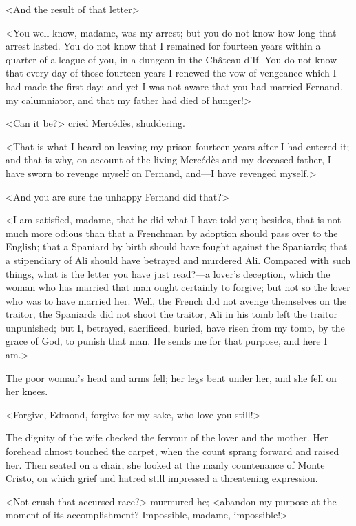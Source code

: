  <And the result of that letter\longdash> 

 <You well know, madame, was my arrest; but you do not know how long that arrest lasted. You do not know that I remained for fourteen years within a quarter of a league of you, in a dungeon in the Château d'If. You do not know that every day of those fourteen years I renewed the vow of vengeance which I had made the first day; and yet I was not aware that you had married Fernand, my calumniator, and that my father had died of hunger!> 

 <Can it be?> cried Mercédès, shuddering. 

 <That is what I heard on leaving my prison fourteen years after I had entered it; and that is why, on account of the living Mercédès and my deceased father, I have sworn to revenge myself on Fernand, and—I have revenged myself.> 

 <And you are sure the unhappy Fernand did that?> 

 <I am satisfied, madame, that he did what I have told you; besides, that is not much more odious than that a Frenchman by adoption should pass over to the English; that a Spaniard by birth should have fought against the Spaniards; that a stipendiary of Ali should have betrayed and murdered Ali. Compared with such things, what is the letter you have just read?—a lover's deception, which the woman who has married that man ought certainly to forgive; but not so the lover who was to have married her. Well, the French did not avenge themselves on the traitor, the Spaniards did not shoot the traitor, Ali in his tomb left the traitor unpunished; but I, betrayed, sacrificed, buried, have risen from my tomb, by the grace of God, to punish that man. He sends me for that purpose, and here I am.> 

 The poor woman's head and arms fell; her legs bent under her, and she fell on her knees. 

 <Forgive, Edmond, forgive for my sake, who love you still!> 

 The dignity of the wife checked the fervour of the lover and the mother. Her forehead almost touched the carpet, when the count sprang forward and raised her. Then seated on a chair, she looked at the manly countenance of Monte Cristo, on which grief and hatred still impressed a threatening expression. 

 <Not crush that accursed race?> murmured he; <abandon my purpose at the moment of its accomplishment? Impossible, madame, impossible!> 

